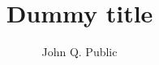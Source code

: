 \documentclass[a4paper,UKenglish]{tgdkmaster-v2021}
\begin{document}
\begin{contentslist}

\contitem
\title{Dummy title}
\author{John Q. Public}

\end{contentslist}
\end{document}
